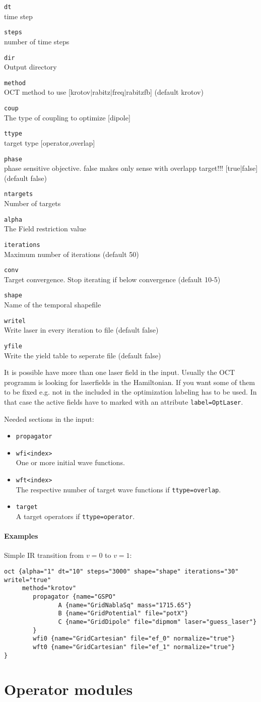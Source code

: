 \documentclass[a4paper,12pt]{scrbook}
\newcommand{\option}[2]{\item \texttt{#1}\\ #2}
\newcommand{\code}[1]{\texttt{#1}}
\begin{document}
\begin{options}
\option{dt}{time step}
\option{steps}{number of time steps}
\option{dir}{Output directory}
\option{method}{OCT method to use [krotov$|$rabitz$|$freq$|$rabitzfb] (default krotov)}
\option{coup}{The type of coupling to optimize [dipole]}
\option{ttype}{target type [operator,overlap]}
\option{phase}{phase sensitive objective. false makes only sense with overlapp target!!! [true|false] (default false)}
\option{ntargets}{Number of targets}
\option{alpha}{The Field restriction value}
\option{iterations}{Maximum number of iterations (default 50)}
\option{conv}{Target convergence. Stop iterating if below convergence (default 10-5)}
\option{shape}{Name of the temporal shapefile}
\option{writel}{Write laser in every iteration to file (default false)}
\option{yfile}{Write the yield table to seperate file (default false)}
\end{options}
It is possible have more than one laser field in the input. Usually the OCT programm
is looking for laserfields in the Hamiltonian. If you want some of them to be fixed e.g. not in
the included in the optimization labeling has to be used.
In that case the active fields have to marked with an attribute \verb|label=OptLaser|.

Needed sections in the input:
\begin{itemize}
 \option{propagator}{}
 \option{wfi<index>}{One or more initial wave functions.}
 \option{wft<index>}{The respective number of target wave functions if \code{ttype=overlap}.}
 \option{target}{A target operators if \code{ttype=operator}.}
\end{itemize}



\subsubsection*{Examples}
Simple IR transition from $v=0$ to $v=1$:
\begin{verbatim}
oct {alpha="1" dt="10" steps="3000" shape="shape" iterations="30" writel="true"
     method="krotov"
        propagator {name="GSPO"
               A {name="GridNablaSq" mass="1715.65"}
               B {name="GridPotential" file="potX"}
               C {name="GridDipole" file="dipmom" laser="guess_laser"}
        }
        wfi0 {name="GridCartesian" file="ef_0" normalize="true"}
        wft0 {name="GridCartesian" file="ef_1" normalize="true"}
} 
\end{verbatim}


\chapter{Operator modules}
\end{document}
